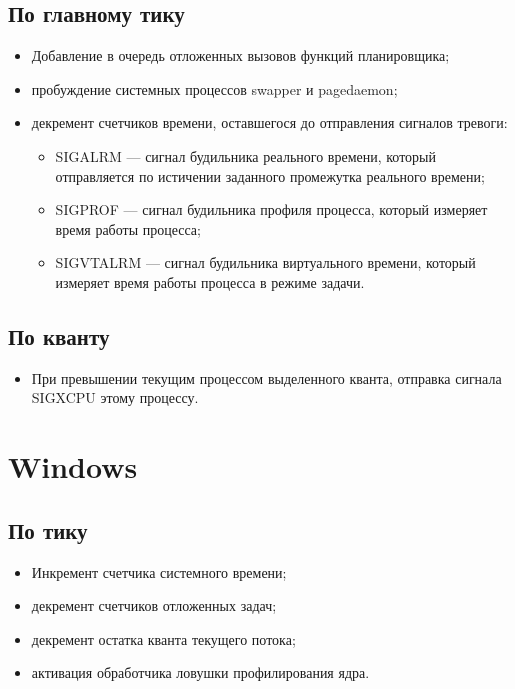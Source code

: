 \documentclass[12pt]{report}
\begin{document}
\subsection{По главному тику}
\begin{itemize}
	\item	Добавление в очередь отложенных вызовов функций планировщика;
	\item	пробуждение системных процессов swapper и pagedaemon;
	
	\item	декремент счетчиков времени, оставшегося до отправления сигналов тревоги:
	\begin{itemize}
		\item	SIGALRM — сигнал будильника реального времени, который отправляется по истичении заданного промежутка реального времени;
		\item	SIGPROF — сигнал будильника профиля процесса, который измеряет время работы процесса;
		\item	SIGVTALRM — сигнал будильника виртуального времени,
		который измеряет время работы процесса в режиме задачи.
	\end{itemize}
\end{itemize}

\subsection{По кванту}

\begin{itemize}
	\item При превышении текущим процессом выделенного кванта, отправка сигнала SIGXCPU этому процессу.
\end{itemize}

\section{Windows}
\subsection{По тику}
\begin{itemize}
	\item Инкремент счетчика системного времени;
	\item декремент счетчиков отложенных задач;
	\item декремент остатка кванта текущего потока;
	\item активация обработчика ловушки профилирования ядра.
\end{itemize}
\end{document}
